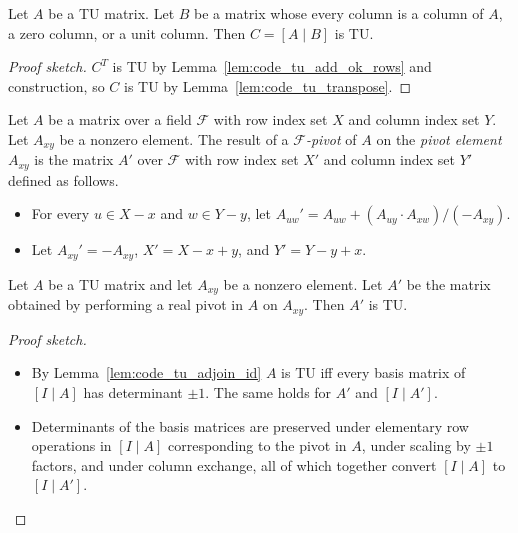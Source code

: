 \begin{corollary}
  \label{cor:code_tu_add_ok_cols}
  Let $A$ be a TU matrix. Let $B$ be a matrix whose every column is a column of $A$, a zero column, or a unit column. Then $C = \left[ A \mid B \right]$ is TU.
\end{corollary}

\begin{proof}[Proof sketch]
  $C^{T}$ is TU by Lemma~\ref{lem:code_tu_add_ok_rows} and construction, so $C$ is TU by Lemma~\ref{lem:code_tu_transpose}.
\end{proof}

\begin{definition}
  \label{def:code_pivot}
  Let $A$ be a matrix over a field $\mathcal{F}$ with row index set $X$ and column index set $Y$.
  Let $A_{xy}$ be a nonzero element.
  The result of a \emph{$\mathcal{F}$-pivot} of $A$ on the \emph{pivot element} $A_{xy}$
  is the matrix $A'$ over $\mathcal{F}$ with row index set $X'$ and column index set $Y'$ defined as follows.
  \begin{itemize}
    \item For every $u \in X - x$ and $w \in Y - y$, let $A_{uw}' = A_{uw} + (A_{uy} \cdot A_{xw}) / (-A_{xy})$.
    \item Let $A_{xy}' = -A_{xy}$, $X' = X - x + y$, and $Y' = Y - y + x$.
  \end{itemize}
\end{definition}

\begin{lemma}
  \label{lem:code_pivot_tu}
  Let $A$ be a TU matrix and let $A_{xy}$ be a nonzero element.
  Let $A'$ be the matrix obtained by performing a real pivot in $A$ on $A_{xy}$.
  Then $A'$ is TU.
\end{lemma}

\begin{proof}[Proof sketch]
  \begin{itemize}
    \item By Lemma~\ref{lem:code_tu_adjoin_id} $A$ is TU iff every basis matrix of $\left[ I \mid A \right]$ has determinant $\pm 1$. The same holds for $A'$ and $\left[ I \mid A' \right]$.
    \item Determinants of the basis matrices are preserved under elementary row operations in $\left[ I \mid A \right]$ corresponding to the pivot in $A$, under scaling by $\pm 1$ factors, and under column exchange, all of which together convert $\left[ I \mid A \right]$ to $\left[ I \mid A' \right]$.
  \end{itemize}
\end{proof}

